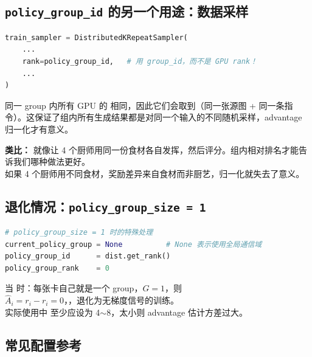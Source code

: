 \subsection{\texttt{policy\_group\_id} 的另一个用途：数据采样}

\begin{lstlisting}[language=Python]
train_sampler = DistributedKRepeatSampler(
    ...
    rank=policy_group_id,   # 用 group_id，而不是 GPU rank！
    ...
)
\end{lstlisting}

同一 group 内所有 GPU 的  相同，因此它们会取到（同一张源图 + 同一条指令）。这保证了组内所有生成结果都是对同一个输入的不同随机采样，advantage 归一化才有意义。

\begin{intubox}
\textbf{类比：} 就像让 4 个厨师用同一份食材各自发挥，然后评分。组内相对排名才能告诉我们哪种做法更好。\\
如果 4 个厨师用不同食材，奖励差异来自食材而非厨艺，归一化就失去了意义。
\end{intubox}

\subsection{退化情况：\texttt{policy\_group\_size = 1}}

\begin{lstlisting}[language=Python]
# policy_group_size = 1 时的特殊处理
current_policy_group = None          # None 表示使用全局通信域
policy_group_id      = dist.get_rank()
policy_group_rank    = 0
\end{lstlisting}

\begin{warnbox}
当  时：每张卡自己就是一个 group，$G=1$，则\\
$\hat{A}_i = r_i - r_i = 0$，，退化为无梯度信号的训练。\\
实际使用中  至少应设为 4$\sim$8，太小则 advantage 估计方差过大。
\end{warnbox}

\subsection{常见配置参考}

